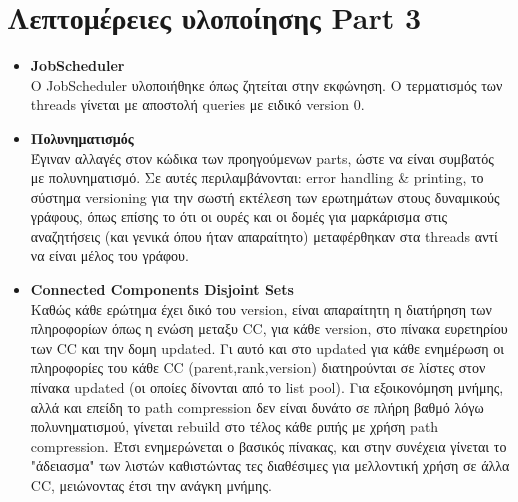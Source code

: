 \documentclass[11pt]{article}
\begin{document}
\section{Λεπτομέρειες υλοποίησης Part 3}
\begin{itemize}
\item \textbf{JobScheduler}\\
Ο JobScheduler υλοποιήθηκε όπως ζητείται στην εκφώνηση. Ο τερματισμός των threads γίνεται με αποστολή queries με ειδικό version 0.
\item \textbf{Πολυνηματισμός}\\
Έγιναν αλλαγές στον κώδικα των προηγούμενων parts, ώστε να είναι συμβατός με πολυνηματισμό. Σε αυτές περιλαμβάνονται: error handling \& printing, το σύστημα versioning για την σωστή εκτέλεση των ερωτημάτων στους δυναμικούς γράφους, όπως επίσης το ότι οι ουρές και οι δομές για μαρκάρισμα στις αναζητήσεις (και γενικά όπου ήταν απαραίτητο) μεταφέρθηκαν στα threads αντί να είναι μέλος του γράφου.
\item \textbf{Connected Components Disjoint Sets}\\
Καθώς κάθε ερώτημα έχει δικό του version, είναι απαραίτητη η διατήρηση των πληροφορίων όπως η ενώση μεταξυ CC, για κάθε version, στο πίνακα ευρετηρίου των CC και την δομη updated. Γι αυτό και στο updated για κάθε ενημέρωση οι πληροφορίες του κάθε CC (parent,rank,version) διατηρούνται σε λίστες στον πίνακα updated (οι οποίες δίνονται από το list pool). Για εξοικονόμηση μνήμης, αλλά και επείδη το path compression δεν είναι δυνάτο σε πλήρη βαθμό λόγω πολυνηματισμού, γίνεται rebuild στο τέλος κάθε ριπής με χρήση path compression. Έτσι ενημερώνεται ο βασικός πίνακας, και στην συνέχεια γίνεται το "άδειασμα" των λιστών καθιστώντας τες διαθέσιμες για μελλοντική χρήση σε άλλα CC, μειώνοντας έτσι την ανάγκη μνήμης. 

\end{itemize}
\end{document}
